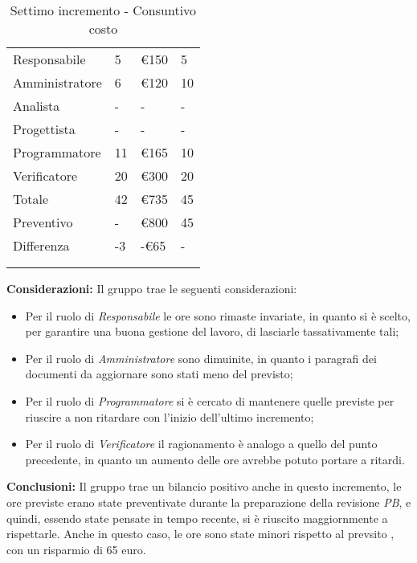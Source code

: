{{\begin{longtable}{C{.4\freewidth} C{.2\freewidth} C{.2\freewidth} C{.2\freewidth}}
                Responsabile & 5 & \euro150 & 5 \\
                Amministratore & 6 & \euro120 & 10\\
                Analista & - & - & - \\
                Progettista & - & - & -\\
                Programmatore & 11 & \euro165 & 10\\
                Verificatore & 20 & \euro300 & 20 \\
                Totale & 42 & \euro735 & 45 \\
                Preventivo & - & \euro800 & 45\\
                Differenza & -3 & -\euro65 & -\\
                \bottomrule
                \\
                \caption{Settimo incremento - Consuntivo costo}
          
                \end{longtable}
                \textbf{Considerazioni:} Il gruppo trae le seguenti considerazioni:
                \begin{itemize}
                    \item Per il ruolo di \textit{Responsabile} le ore sono rimaste invariate, in quanto si è scelto, per garantire una buona gestione del lavoro, di lasciarle tassativamente tali;
                    \item Per il ruolo di \textit{Amministratore} sono dimuinite, in quanto i paragrafi dei documenti da aggiornare sono stati meno del previsto;
                    \item Per il ruolo di \textit{Programmatore} si è cercato di mantenere quelle previste per riuscire a non ritardare con l'inizio dell'ultimo incremento; 
                    \item Per il ruolo di \textit{Verificatore} il ragionamento è analogo a quello del punto precedente, in quanto un aumento delle ore avrebbe potuto portare a ritardi.
                \end{itemize} 
                \textbf{Conclusioni:} Il gruppo trae un bilancio positivo anche in questo incremento, le ore previste erano state preventivate durante la preparazione della revisione \textit{PB}, e quindi, 
                essendo state pensate in tempo recente, si è riuscito maggiornmente a rispettarle. Anche in questo caso, le ore sono state minori rispetto al prevsito , con un risparmio di 65 euro.
            }
            }
